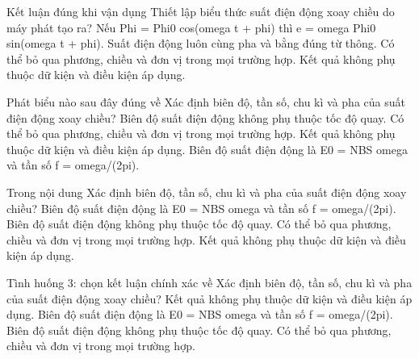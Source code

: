 \begin{ex}
Kết luận đúng khi vận dụng Thiết lập biểu thức suất điện động xoay chiều do máy phát tạo ra?
\choice
{\True Nếu Phi = Phi0 cos(omega t + phi) thì e = omega Phi0 sin(omega t + phi).}
{Suất điện động luôn cùng pha và bằng đúng từ thông.}
{Có thể bỏ qua phương, chiều và đơn vị trong mọi trường hợp.}
{Kết quả không phụ thuộc dữ kiện và điều kiện áp dụng.}
\end{ex}

\begin{ex}
Phát biểu nào sau đây đúng về Xác định biên độ, tần số, chu kì và pha của suất điện động xoay chiều?
\choice
{Biên độ suất điện động không phụ thuộc tốc độ quay.}
{Có thể bỏ qua phương, chiều và đơn vị trong mọi trường hợp.}
{Kết quả không phụ thuộc dữ kiện và điều kiện áp dụng.}
{\True Biên độ suất điện động là E0 = NBS omega và tần số f = omega/(2pi).}
\end{ex}

\begin{ex}
Trong nội dung Xác định biên độ, tần số, chu kì và pha của suất điện động xoay chiều?
\choice
{\True Biên độ suất điện động là E0 = NBS omega và tần số f = omega/(2pi).}
{Biên độ suất điện động không phụ thuộc tốc độ quay.}
{Có thể bỏ qua phương, chiều và đơn vị trong mọi trường hợp.}
{Kết quả không phụ thuộc dữ kiện và điều kiện áp dụng.}
\end{ex}

\begin{ex}
Tình huống 3: chọn kết luận chính xác về Xác định biên độ, tần số, chu kì và pha của suất điện động xoay chiều?
\choice
{Kết quả không phụ thuộc dữ kiện và điều kiện áp dụng.}
{\True Biên độ suất điện động là E0 = NBS omega và tần số f = omega/(2pi).}
{Biên độ suất điện động không phụ thuộc tốc độ quay.}
{Có thể bỏ qua phương, chiều và đơn vị trong mọi trường hợp.}
\end{ex}

